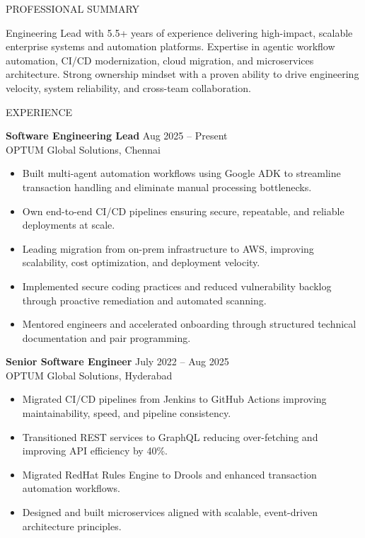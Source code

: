 \documentclass{resume}
\begin{document}
\begin{rSection}{PROFESSIONAL SUMMARY}

Engineering Lead with 5.5+ years of experience delivering high-impact, scalable enterprise systems and automation platforms. Expertise in agentic workflow automation, CI/CD modernization, cloud migration, and microservices architecture. Strong ownership mindset with a proven ability to drive engineering velocity, system reliability, and cross-team collaboration.

\end{rSection}

\begin{rSection}{EXPERIENCE}

\textbf{Software Engineering Lead} \hfill Aug 2025 – Present \\
OPTUM Global Solutions, Chennai
\begin{itemize}
\itemsep -3pt {}
\item Built multi-agent automation workflows using Google ADK to streamline transaction handling and eliminate manual processing bottlenecks.
\item Own end-to-end CI/CD pipelines ensuring secure, repeatable, and reliable deployments at scale.
\item Leading migration from on-prem infrastructure to AWS, improving scalability, cost optimization, and deployment velocity.
\item Implemented secure coding practices and reduced vulnerability backlog through proactive remediation and automated scanning.
\item Mentored engineers and accelerated onboarding through structured technical documentation and pair programming.
\end{itemize}

\textbf{Senior Software Engineer} \hfill July 2022 – Aug 2025 \\
OPTUM Global Solutions, Hyderabad
\begin{itemize}
\itemsep -3pt {}
\item Migrated CI/CD pipelines from Jenkins to GitHub Actions improving maintainability, speed, and pipeline consistency.
\item Transitioned REST services to GraphQL reducing over-fetching and improving API efficiency by 40\%.
\item Migrated RedHat Rules Engine to Drools and enhanced transaction automation workflows.
\item Designed and built microservices aligned with scalable, event-driven architecture principles.
\end{itemize}


\end{rSection}
\end{document}
